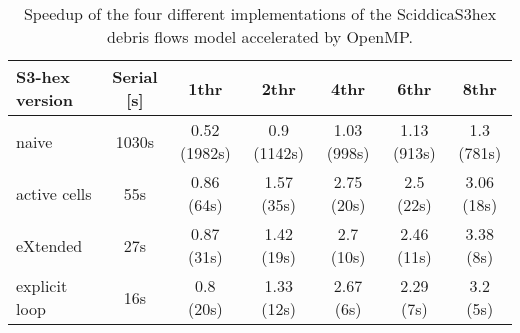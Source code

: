 \begin{table}
  \centering
  \begin{tabular}{l|c|c|c|c|c|c}
    \hline
    S3-hex version & Serial [s] & 1thr & 2thr & 4thr & 6thr & 8thr\\
    \hline
    \hline
    naive         & 1030s & 0.52 (1982s) & 0.9 (1142s) & 1.03 (998s) & 1.13 (913s) & 1.3  (781s)\\
    active cells  & 55s   & 0.86 (64s)   & 1.57 (35s)  & 2.75 (20s)  & 2.5  (22s)  & 3.06 (18s)\\
    eXtended      & 27s   & 0.87 (31s)   & 1.42 (19s)  & 2.7  (10s)  & 2.46 (11s)  & 3.38 (8s)\\
    explicit loop & 16s   & 0.8  (20s)   & 1.33 (12s)  & 2.67 (6s)  & 2.29  (7s)   & 3.2  (5s)\\
    \hline
  \end{tabular}
  \caption{Speedup of the four different
    implementations of the SciddicaS3hex debris flows model accelerated by OpenMP.}
  \label{tab:speedup}
\end{table} 
